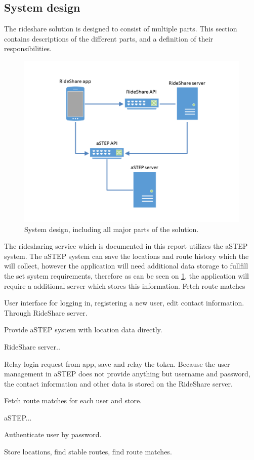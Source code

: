 \subsection{System design}
The rideshare solution is designed to consist of multiple parts.
This section contains descriptions of the different parts, and a definition of their responsibilities.

\begin{figure}[!h]
	\centering
	\includegraphics[width=\textwidth]{figures/SystemDesign.png}
	\caption{System design, including all major parts of the solution.}
	\label{fig:s2systemdesign}
\end{figure}

The ridesharing service which is documented in this report utilizes the aSTEP system.
The aSTEP system can save the locations and route history which the will collect, however the application will need additional data storage to fullfill the set system requirements, therefore as can be seen on \ref{fig:s2systemdesign}, the application will require a additional server which stores this information.
Fetch route matches

User interface for logging in, registering a new user, edit contact information.
Through RideShare server.

Provide aSTEP system with location data directly.



RideShare server..

Relay login request from app, save and relay the token.
Because the user management in aSTEP does not provide anything but username and password, the contact information and other data is stored on the RideShare server.


Fetch route matches for each user and store.



aSTEP...

Authenticate user by password.

Store locations, find stable routes, find route matches.
